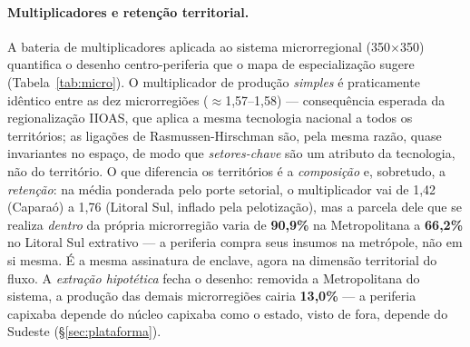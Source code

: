 \documentclass[11pt,a4paper]{article}
\begin{document}
\paragraph{Multiplicadores e retenção territorial.}
A bateria de multiplicadores aplicada ao sistema microrregional (350$\times$350)
quantifica o desenho centro-periferia que o mapa de especialização sugere
(Tabela~\ref{tab:micro}). O multiplicador de produção \emph{simples} é praticamente
idêntico entre as dez microrregiões ($\approx$1,57--1,58) --- consequência esperada da
regionalização IIOAS, que aplica a mesma tecnologia nacional a todos os territórios; as
ligações de Rasmussen-Hirschman são, pela mesma razão, quase invariantes no espaço, de
modo que \emph{setores-chave} são um atributo da tecnologia, não do território. O que
diferencia os territórios é a \emph{composição} e, sobretudo, a \emph{retenção}: na média
ponderada pelo porte setorial, o multiplicador vai de 1,42 (Caparaó) a 1,76 (Litoral Sul,
inflado pela pelotização), mas a parcela dele que se realiza \emph{dentro} da própria
microrregião varia de \textbf{90,9\%} na Metropolitana a \textbf{66,2\%} no Litoral Sul
extrativo --- a periferia compra seus insumos na metrópole, não em si mesma. É a mesma
assinatura de enclave, agora na dimensão territorial do fluxo. A \emph{extração hipotética}
\citep{dietzenbacher1993} fecha o desenho: removida a Metropolitana do sistema, a produção
das demais microrregiões cairia \textbf{13,0\%} --- a periferia capixaba depende do núcleo
capixaba como o estado, visto de fora, depende do Sudeste (\S\ref{sec:plataforma}).
\end{document}
